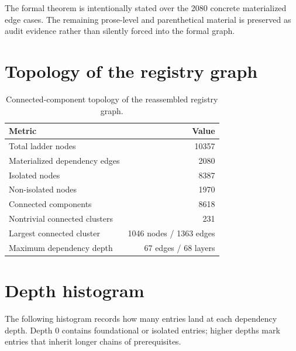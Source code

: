 \documentclass[11pt]{article}
\theoremstyle{remark}
\begin{document}
The formal theorem is intentionally stated over the 2080 concrete materialized edge cases. The remaining prose-level and parenthetical material is preserved as audit evidence rather than silently forced into the formal graph.

\section{Topology of the registry graph}
\label{sec:topology}

\begin{table}[H]
\centering
\small
\caption{Connected-component topology of the reassembled registry graph.}
\label{tab:topology}
\begin{tabular}{lr}
\toprule
Metric & Value \\
\midrule
Total ladder nodes & 10357 \\
Materialized dependency edges & 2080 \\
Isolated nodes & 8387 \\
Non-isolated nodes & 1970 \\
Connected components & 8618 \\
Nontrivial connected clusters & 231 \\
Largest connected cluster & 1046 nodes / 1363 edges \\
Maximum dependency depth & 67 edges / 68 layers \\
\bottomrule
\end{tabular}
\end{table}

\begin{center}
\end{center}

\section{Depth histogram}
\label{sec:histogram}

The following histogram records how many entries land at each dependency depth. Depth 0 contains foundational or isolated entries; higher depths mark entries that inherit longer chains of prerequisites.
\end{document}

